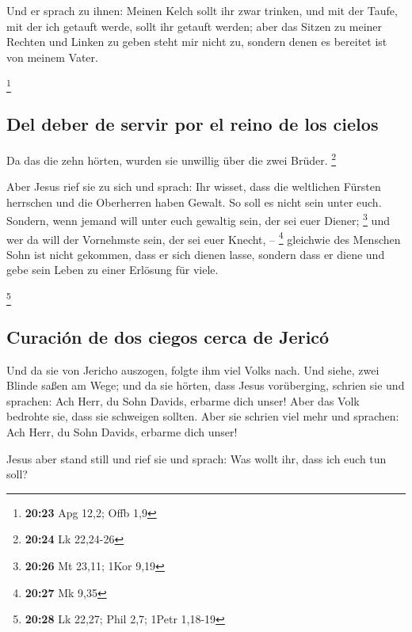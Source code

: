  Und er sprach zu ihnen: Meinen Kelch sollt ihr zwar
trinken, und mit der Taufe, mit der ich getauft werde, sollt ihr getauft
werden; aber das Sitzen zu meiner Rechten und Linken zu geben steht mir
nicht zu, sondern denen es bereitet ist von meinem Vater.

\footnote{\textbf{20:23} Apg 12,2; Offb 1,9}

\hypertarget{del-deber-de-servir-por-el-reino-de-los-cielos}{%
\subsection{Del deber de servir por el reino de los
cielos}\label{del-deber-de-servir-por-el-reino-de-los-cielos}}

 Da das die zehn hörten, wurden sie unwillig über die
zwei Brüder. \footnote{\textbf{20:24} Lk 22,24-26}

 Aber Jesus rief sie zu sich und sprach: Ihr wisset, dass
die weltlichen Fürsten herrschen und die Oberherren haben Gewalt.
 So soll es nicht sein unter euch. Sondern, wenn jemand
will unter euch gewaltig sein, der sei euer Diener; \footnote{\textbf{20:26}
  Mt 23,11; 1Kor 9,19}  und wer da will der Vornehmste
sein, der sei euer Knecht, -- \footnote{\textbf{20:27} Mk 9,35}
 gleichwie des Menschen Sohn ist nicht gekommen, dass er
sich dienen lasse, sondern dass er diene und gebe sein Leben zu einer
Erlösung für viele.

\footnote{\textbf{20:28} Lk 22,27; Phil 2,7; 1Petr 1,18-19}

\hypertarget{curaciuxf3n-de-dos-ciegos-cerca-de-jericuxf3}{%
\subsection{Curación de dos ciegos cerca de
Jericó}\label{curaciuxf3n-de-dos-ciegos-cerca-de-jericuxf3}}

 Und da sie von Jericho auszogen, folgte ihm viel Volks
nach.  Und siehe, zwei Blinde saßen am Wege; und da sie
hörten, dass Jesus vorüberging, schrien sie und sprachen: Ach Herr, du
Sohn Davids, erbarme dich unser!  Aber das Volk bedrohte
sie, dass sie schweigen sollten. Aber sie schrien viel mehr und
sprachen: Ach Herr, du Sohn Davids, erbarme dich unser!

 Jesus aber stand still und rief sie und sprach: Was
wollt ihr, dass ich euch tun soll?

